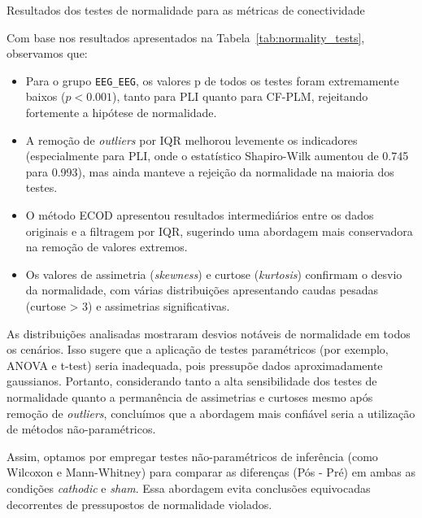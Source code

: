 \begin{table}[htbp]
    \caption{Resultados dos testes de normalidade para as métricas de conectividade}
    \label{tab:normality_tests}
    \begin{adjustbox}{width=\textwidth, center}
      
    \end{adjustbox}
  \end{table}
  
Com base nos resultados apresentados na Tabela~\ref{tab:normality_tests}, observamos que:

\begin{itemize}
    \item Para o grupo \texttt{EEG\_EEG}, os valores p de todos os testes foram extremamente baixos ($p < 0.001$), tanto para PLI quanto para CF-PLM, rejeitando fortemente a hipótese de normalidade.
    
    \item A remoção de \textit{outliers} por IQR melhorou levemente os indicadores (especialmente para PLI, onde o estatístico Shapiro-Wilk aumentou de 0.745 para 0.993), mas ainda manteve a rejeição da normalidade na maioria dos testes.
    
    \item O método ECOD apresentou resultados intermediários entre os dados originais e a filtragem por IQR, sugerindo uma abordagem mais conservadora na remoção de valores extremos.
    
    \item Os valores de assimetria (\textit{skewness}) e curtose (\textit{kurtosis}) confirmam o desvio da normalidade, com várias distribuições apresentando caudas pesadas (curtose > 3) e assimetrias significativas.
\end{itemize}

As distribuições analisadas mostraram desvios notáveis de normalidade em todos os cenários. Isso sugere que a aplicação de testes paramétricos (por exemplo, ANOVA e t-test) seria inadequada, pois pressupõe dados aproximadamente gaussianos. 
Portanto, considerando tanto a alta sensibilidade dos testes de normalidade quanto a permanência de assimetrias e curtoses mesmo após remoção de \textit{outliers}, concluímos que a abordagem mais confiável seria a utilização de métodos não-paramétricos.

Assim, optamos por empregar testes não-paramétricos de inferência (como Wilcoxon e Mann-Whitney) para comparar as diferenças (Pós - Pré) em ambas as condições \textit{cathodic} e \textit{sham}. Essa abordagem evita conclusões equivocadas decorrentes de pressupostos de normalidade violados.
